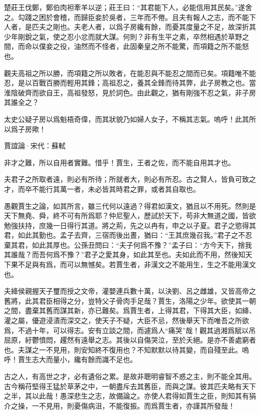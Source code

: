 \documentclass[12pt,a4paper]{ctexbook}
\begin{document}
楚莊王伐鄭，鄭伯肉袒牽羊以逆；莊王曰：“其君能下人，必能信用其民矣。”遂舍之。勾踐之困於會稽，而歸臣妾於吳者，三年而不倦。且夫有報人之志，而不能下人者，是匹夫之剛也。夫老人者，以爲子房纔有餘，而憂其度量之不足，故深折其少年剛銳之氣，使之忍小忿而就大謀。何則？非有生平之素，卒然相遇於草野之間，而命以僕妾之役，油然而不怪者，此固秦皇之所不能驚，而項籍之所不能怒也。\par
觀夫高祖之所以勝，而項籍之所以敗者，在能忍與不能忍之間而已矣。項籍唯不能忍，是以百戰百勝而輕用其鋒；高祖忍之，養其全鋒而待其弊，此子房教之也。當淮陰破齊而欲自王，高祖發怒，見於詞色。由此觀之，猶有剛強不忍之氣，非子房其誰全之？\par
太史公疑子房以爲魁梧奇偉，而其狀貌乃如婦人女子，不稱其志氣。嗚呼！此其所以爲子房歟！\par
賈誼論·宋代：蘇軾 \par
非才之難，所以自用者實難。惜乎！賈生，王者之佐，而不能自用其才也。\par
夫君子之所取者遠，則必有所待；所就者大，則必有所忍。古之賢人，皆負可致之才，而卒不能行其萬一者，未必皆其時君之罪，或者其自取也。\par
愚觀賈生之論，如其所言，雖三代何以遠過？得君如漢文，猶且以不用死。然則是天下無堯、舜，終不可有所爲耶？仲尼聖人，歷試於天下，苟非大無道之國，皆欲勉強扶持，庶幾一日得行其道。將之荊，先之以冉有，申之以子夏。君子之慾得其君，如此其勤也。孟子去齊，三宿而後出晝，猶曰：“王其庶幾召我。”君子之不忍棄其君，如此其厚也。公孫丑問曰：“夫子何爲不豫？”孟子曰：“方今天下，捨我其誰哉？而吾何爲不豫？”君子之愛其身，如此其至也。夫如此而不用，然後知天下果不足與有爲，而可以無憾矣。若賈生者，非漢文之不能用生，生之不能用漢文也。\par
夫絳侯親握天子璽而授之文帝，灌嬰連兵數十萬，以決劉、呂之雌雄，又皆高帝之舊將，此其君臣相得之分，豈特父子骨肉手足哉？賈生，洛陽之少年。欲使其一朝之間，盡棄其舊而謀其新，亦已難矣。爲賈生者，上得其君，下得其大臣，如絳、灌之屬，優遊浸漬而深交之，使天子不疑，大臣不忌，然後舉天下而唯吾之所欲爲，不過十年，可以得志。安有立談之間，而遽爲人“痛哭”哉！觀其過湘爲賦以吊屈原，紆鬱憤悶，趯然有遠舉之志。其後以自傷哭泣，至於夭絕。是亦不善處窮者也。夫謀之一不見用，則安知終不復用也？不知默默以待其變，而自殘至此。嗚呼！賈生志大而量小，纔有餘而識不足也。\par
古之人，有高世之才，必有遺俗之累。是故非聰明睿智不惑之主，則不能全其用。古今稱苻堅得王猛於草茅之中，一朝盡斥去其舊臣，而與之謀。彼其匹夫略有天下之半，其以此哉！愚深悲生之志，故備論之。亦使人君得如賈生之臣，則知其有狷介之操，一不見用，則憂傷病沮，不能復振。而爲賈生者，亦謹其所發哉！\par
\end{document}
